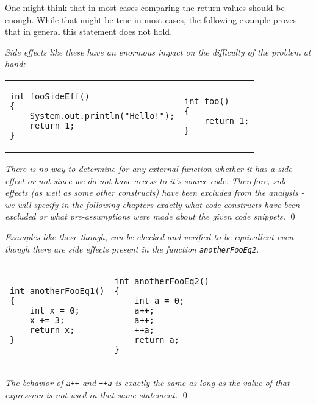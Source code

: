 One might think that in most cases comparing the return values should be enough. While that might be true in most cases, the following example proves that in general this statement does not hold.

\begin{exmp}
\textit{Side effects like these have an enormous impact on the difficulty of the problem at hand:}

\begin{tabular}{ p{4.5cm} p{4.5cm} }
\begin{lstlisting}
int fooSideEff()
{
    System.out.println("Hello!");
    return 1;
}
\end{lstlisting}
&
\begin{lstlisting}
int foo()
{
    return 1;
}
\end{lstlisting}
\end{tabular}

\textit{There is no way to determine for any external function whether it has a side effect or not since we do not have access to it's source code. Therefore, side effects (as well as some other constructs) have been excluded from the analysis - we will specify in the following chapters exactly what code constructs have been excluded or what pre-assumptions were made about the given code snippets.}
\qed
\end{exmp}

\begin{exmp}
\textit{Examples like these though, can be checked and verified to be equivallent even though there are side effects present in the function \texttt{anotherFooEq2}.}

\begin{tabular}{ p{4.5cm} p{4.5cm} }
\begin{lstlisting}
int anotherFooEq1()
{
    int x = 0;
    x += 3;
    return x;
}
\end{lstlisting}
&
\begin{lstlisting}
int anotherFooEq2()
{
    int a = 0;
    a++;
    a++;
    ++a;
    return a;
}
\end{lstlisting}
\label{exmp:PlusPlusExample}
\end{tabular}

\textit{The behavior of \texttt{a++} and \texttt{++a} is exactly the same as long as the value of that expression is not used in that same statement.}
\qed
\end{exmp}

